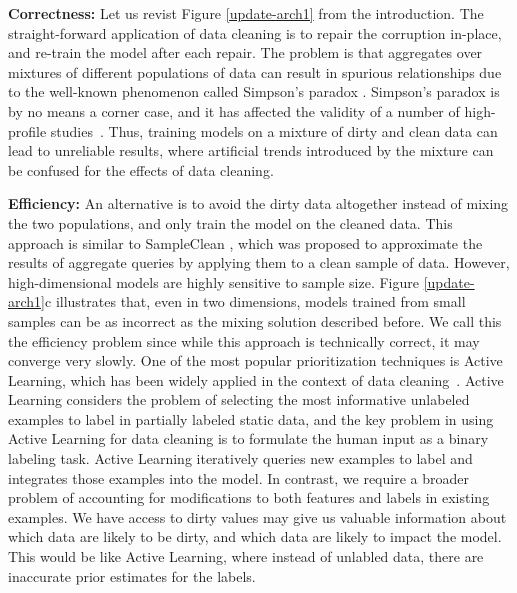 \vspace{0.5em}
\noindent \textbf{Correctness: } Let us revist Figure \ref{update-arch1} from the introduction. 
The straight-forward application of data cleaning is to repair the corruption in-place, and re-train the model after each repair.
The problem is that aggregates over mixtures of different populations of data can result in spurious relationships due to the well-known phenomenon called Simpson's paradox \cite{simpson1951interpretation}.
Simpson's paradox is by no means a corner case, and it has affected the validity of a number of high-profile studies~\cite{simpsonsparadox}.
Thus, training models on a mixture of dirty and clean data can lead to unreliable results, where artificial trends introduced by the mixture can be confused for the effects of data cleaning.

\vspace{0.5em}
\noindent \textbf{Efficiency: } An alternative is to avoid the dirty data altogether instead of mixing the two populations, and only train the model on the cleaned data.
This approach is similar to SampleClean \cite{wang1999sample}, which was proposed to approximate the results of aggregate queries by applying them to a clean sample of data.
However, high-dimensional models are highly sensitive to sample size.
Figure \ref{update-arch1}c illustrates that, even in two dimensions, models trained from small samples can be as incorrect as the mixing solution described before.
We call this the efficiency problem since while this approach is technically correct, it may converge very slowly.
One of the most popular prioritization techniques is Active Learning, which has been widely applied in the context of data cleaning~\cite{DBLP:journals/pvldb/YakoutENOI11,gokhale2014corleone}.
Active Learning considers the problem of selecting the most informative unlabeled examples to label in partially labeled static data, and the key problem in using Active Learning for data cleaning is to formulate the human input as a binary labeling task.
Active Learning iteratively queries new examples to label and integrates those examples into the model.
In contrast, we require a broader problem of accounting for modifications to both features and labels in existing examples.
We have access to dirty values may give us valuable information about which data are likely to be dirty, and which data are likely to impact the model. 
This would be like Active Learning, where instead of unlabled data, there are inaccurate prior estimates for the labels.




